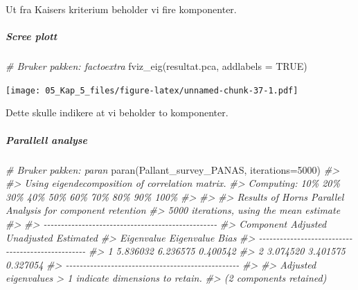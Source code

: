 \documentclass[
]{article}
\newenvironment{Shaded}{\begin{snugshade}}{\end{snugshade}}
\newcommand{\AttributeTok}[1]{\textcolor[rgb]{0.77,0.63,0.00}{#1}}
\newcommand{\CommentTok}[1]{\textcolor[rgb]{0.56,0.35,0.01}{\textit{#1}}}
\newcommand{\ConstantTok}[1]{\textcolor[rgb]{0.00,0.00,0.00}{#1}}
\newcommand{\DecValTok}[1]{\textcolor[rgb]{0.00,0.00,0.81}{#1}}
\newcommand{\FunctionTok}[1]{\textcolor[rgb]{0.00,0.00,0.00}{#1}}
\newcommand{\NormalTok}[1]{#1}
\begin{document}
Ut fra Kaisers kriterium beholder vi fire komponenter.

\hypertarget{scree-plott-1}{%
\subparagraph{Scree plott}\label{scree-plott-1}}

\begin{Shaded}
\begin{Highlighting}[]
\CommentTok{\# Bruker pakken: factoextra}
\FunctionTok{fviz\_eig}\NormalTok{(resultat.pca, }\AttributeTok{addlabels =} \ConstantTok{TRUE}\NormalTok{)}
\end{Highlighting}
\end{Shaded}

\texttt{[image: 05\_Kap\_5\_files/figure-latex/unnamed-chunk-37-1.pdf]}

Dette skulle indikere at vi beholder to komponenter.

\hypertarget{parallell-analyse-1}{%
\subparagraph{Parallell analyse}\label{parallell-analyse-1}}

\begin{Shaded}
\begin{Highlighting}[]
\CommentTok{\# Bruker pakken: paran}
\FunctionTok{paran}\NormalTok{(Pallant\_survey\_PANAS, }\AttributeTok{iterations=}\DecValTok{5000}\NormalTok{)}
\CommentTok{\#\textgreater{} }
\CommentTok{\#\textgreater{} Using eigendecomposition of correlation matrix.}
\CommentTok{\#\textgreater{} Computing: 10\%  20\%  30\%  40\%  50\%  60\%  70\%  80\%  90\%  100\%}
\CommentTok{\#\textgreater{} }
\CommentTok{\#\textgreater{} }
\CommentTok{\#\textgreater{} Results of Horn\textquotesingle{}s Parallel Analysis for component retention}
\CommentTok{\#\textgreater{} 5000 iterations, using the mean estimate}
\CommentTok{\#\textgreater{} }
\CommentTok{\#\textgreater{} {-}{-}{-}{-}{-}{-}{-}{-}{-}{-}{-}{-}{-}{-}{-}{-}{-}{-}{-}{-}{-}{-}{-}{-}{-}{-}{-}{-}{-}{-}{-}{-}{-}{-}{-}{-}{-}{-}{-}{-}{-}{-}{-}{-}{-}{-}{-}{-}{-}{-} }
\CommentTok{\#\textgreater{} Component   Adjusted    Unadjusted    Estimated }
\CommentTok{\#\textgreater{}             Eigenvalue  Eigenvalue    Bias }
\CommentTok{\#\textgreater{} {-}{-}{-}{-}{-}{-}{-}{-}{-}{-}{-}{-}{-}{-}{-}{-}{-}{-}{-}{-}{-}{-}{-}{-}{-}{-}{-}{-}{-}{-}{-}{-}{-}{-}{-}{-}{-}{-}{-}{-}{-}{-}{-}{-}{-}{-}{-}{-}{-}{-} }
\CommentTok{\#\textgreater{} 1           5.836032    6.236575      0.400542}
\CommentTok{\#\textgreater{} 2           3.074520    3.401575      0.327054}
\CommentTok{\#\textgreater{} {-}{-}{-}{-}{-}{-}{-}{-}{-}{-}{-}{-}{-}{-}{-}{-}{-}{-}{-}{-}{-}{-}{-}{-}{-}{-}{-}{-}{-}{-}{-}{-}{-}{-}{-}{-}{-}{-}{-}{-}{-}{-}{-}{-}{-}{-}{-}{-}{-}{-} }
\CommentTok{\#\textgreater{} }
\CommentTok{\#\textgreater{} Adjusted eigenvalues \textgreater{} 1 indicate dimensions to retain.}
\CommentTok{\#\textgreater{} (2 components retained)}
\end{Highlighting}
\end{Shaded}
\end{document}
